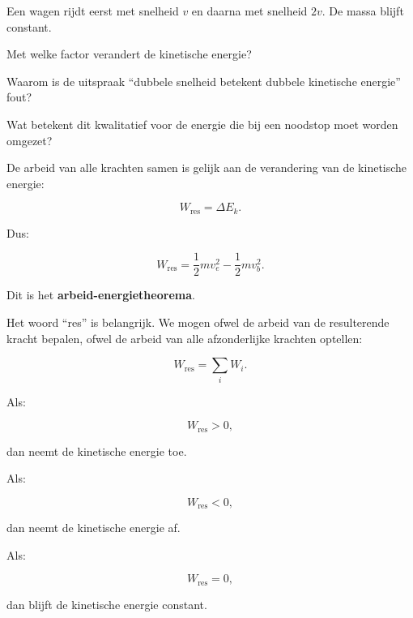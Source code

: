 \documentclass{ximera}
\begin{document}
\begin{oefening}{\oefB}

Een wagen rijdt eerst met snelheid $v$ en daarna met snelheid $2v$. De massa
blijft constant.

\begin{question}
Met welke factor verandert de kinetische energie?
\end{question}

\begin{question}
Waarom is de uitspraak ``dubbele snelheid betekent dubbele kinetische
energie'' fout?
\end{question}

\begin{question}
Wat betekent dit kwalitatief voor de energie die bij een noodstop moet
worden omgezet?
\end{question}

\end{oefening}



De arbeid van alle krachten samen is gelijk aan de verandering van de
kinetische energie:

\[
\boxed{
W_{\mathrm{res}}
=
\Delta E_k.
}
\]

Dus:

\[
\boxed{
W_{\mathrm{res}}
=
\frac12mv_e^2-\frac12mv_b^2.
}
\]

Dit is het \textbf{arbeid-energietheorema}.

Het woord ``res'' is belangrijk. We mogen ofwel de arbeid van de resulterende
kracht bepalen, ofwel de arbeid van alle afzonderlijke krachten optellen:

\[
W_{\mathrm{res}}
=
\sum_i W_i.
\]

Als:

\[
W_{\mathrm{res}}>0,
\]

dan neemt de kinetische energie toe.

Als:

\[
W_{\mathrm{res}}<0,
\]

dan neemt de kinetische energie af.

Als:

\[
W_{\mathrm{res}}=0,
\]

dan blijft de kinetische energie constant.


\end{document}
